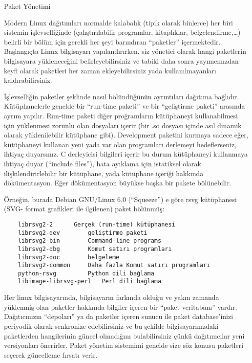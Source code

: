 \begin{section}{Paket Yönetimi}

Modern Linux dağıtımları normalde kalabalık (tipik olarak binlerce) her biri sistemin işlevselliğinde (çalıştırılabilir programlar, kitaplıklar, belgelendirme,…) belirli bir bölüm için gerekli her şeyi barındıran “paketler” içermektedir. Başlangıçta Linux bilgisayarı yapılandırırken, siz yönetici olarak hangi paketlerin bilgisayara yükleneceğini belirleyebilirsiniz ve tabiki daha sonra yayımcınızdan keyfi olarak paketleri her zaman ekleyebilirsiniz yada kullanılmayanları kaldırabilirsiniz.

İşlevselliğin paketler şeklinde nasıl bölündüğünün ayrıntıları dağıtıma bağlıdır. Kütüphanelerle genelde bir “run-time paketi” ve bir “geliştirme paketi” arasında ayrım yapılır. Run-time paketi diğer proğramların kütüphaneyi kullanabilmesi için yüklenmesi zorunlu olan dosyaları içerir (bir .so dosyası içinde asıl dinamik olarak yüklenilebilir kütüphane gibi). Development paketini kurmaya sadece eğer, kütüphaneyi kullanan yeni yada var olan programları derlemeyi hedeflerseniz, ihtiyaç duyarsınız. C derleyicisi bilgileri içerir bu durum kütüphaneyi kullanmaya ihtiyaç duyar (“include files”), hata ayıklama için istatiksel olarak ilişkilendirirlebilir bir kütüphane, yada kütüphane içeriği hakkında dökümentasyon. Eğer dökümentasyon büyükse başka bir pakete bölünebilir.

Örneğin, burada Debian GNU/Linux 6.0 (“Squeeze”) e göre rsvg kütüphanesi (SVG- format grafikleri ile ilgilenen) paket bölünmüş: 
\begin{verbatim}
	librsvg2-2 		Gerçek (run-time) kütüphanesi
	librsvg2-dev 		geliştirme paketi
	librsvg2-bin 		Command-line programs
	librsvg2-dbg 		Komut satırı programları
	librsvg2-doc 		belgeleme
	librsvg2-common 	Daha fazla Komut satırı programları
	python-rsvg 		Python dili bağlama
	libimage-librsvg-perl 	Perl dili bağlama
\end{verbatim}

Her linux bilgisayarında, bilgisayarın farkında olduğu ve yakın zamanda yüklenmiş olan paketler hakkında bilgiler içeren bir “paket veritabanı” vardır. Dağıtıcınızın “depoları” ya da paketler içeren sunucu ile paket database’inizi periyodik olarak senkronize edebilirsiniz ve bu şekilde bilgisayarınızdaki paketlerden hangilerinin güncel olmadığını bulabilirsiniz çünkü dağıtımcılar yeni versiyonları önerirler. Paket yönetim sistemimi genelde size söz konusu paketleri seçerek güncelleme fırsatı verir.


\end{section}
